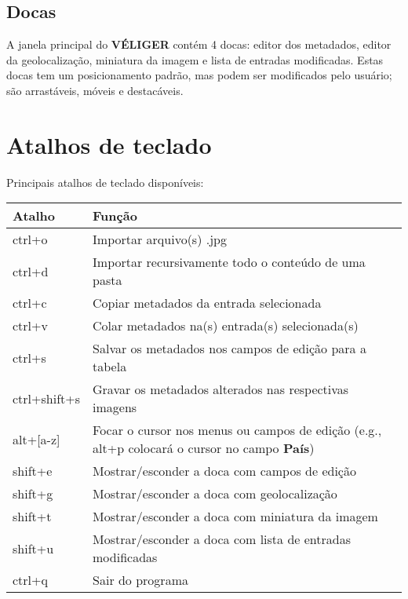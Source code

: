 \documentclass[letterpaper,10pt,portuguese]{manual}
\begin{document}
\section{Docas}

A janela principal do \textbf{VÉLIGER} contém 4 docas: editor dos metadados, editor
da geolocalização, miniatura da imagem e lista de entradas modificadas. Estas docas
tem um posicionamento padrão, mas podem ser modificados pelo usuário; são arrastáveis,
móveis e destacáveis.


\chapter{Atalhos de teclado}

Principais atalhos de teclado disponíveis:

\begin{tabulary}{\textwidth}{|L|L|}
\hline
\textbf{
Atalho
} & \textbf{
Função
}\\
\hline

ctrl+o
 & 
Importar arquivo(s) .jpg
\\

ctrl+d
 & 
Importar recursivamente todo o conteúdo de uma pasta
\\

ctrl+c
 & 
Copiar metadados da entrada selecionada
\\

ctrl+v
 & 
Colar metadados na(s) entrada(s) selecionada(s)
\\

ctrl+s
 & 
Salvar os metadados nos campos de edição para a tabela
\\

ctrl+shift+s
 & 
Gravar os metadados alterados nas respectivas imagens
\\

alt+{[}a-z{]}
 & 
Focar o cursor nos menus ou campos de edição
(e.g., alt+p colocará o cursor no campo \textbf{País})
\\

shift+e
 & 
Mostrar/esconder a doca com campos de edição
\\

shift+g
 & 
Mostrar/esconder a doca com geolocalização
\\

shift+t
 & 
Mostrar/esconder a doca com miniatura da imagem
\\

shift+u
 & 
Mostrar/esconder a doca com lista de entradas modificadas
\\

ctrl+q
 & 
Sair do programa
\\
\hline
\end{tabulary}
\end{document}
